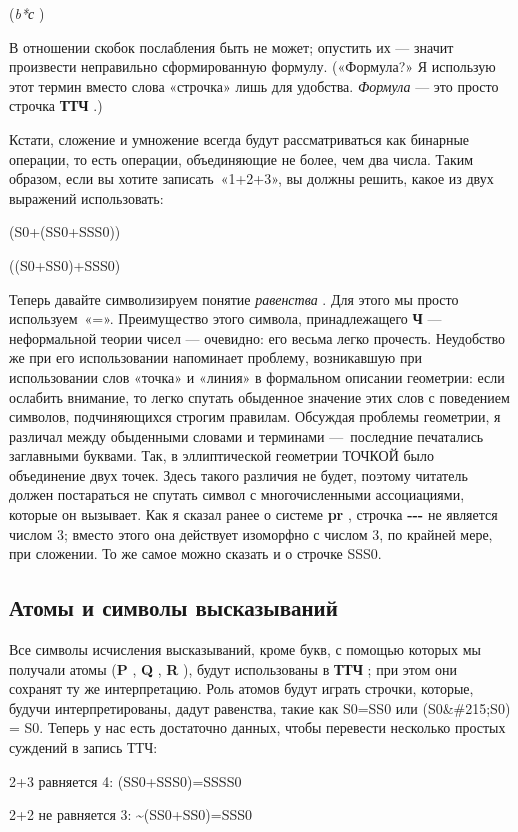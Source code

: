 \documentclass[../main.tex]{subfiles}
\begin{document}
(\emph{b*с} )

В отношении скобок послабления быть не может; опустить их --- значит произвести неправильно сформированную формулу. («Формула?» Я использую этот термин вместо слова «строчка» лишь для удобства. \emph{Формула} --- это просто строчка \textbf{ТТЧ} .)

Кстати, сложение и умножение всегда будут рассматриваться как бинарные операции, то есть операции, объединяющие не более, чем два числа. Таким образом, если вы хотите записать~«1+2+3», вы должны решить, какое из двух выражений использовать:

(S0+(SS0+SSS0))

((S0+SS0)+SSS0)

Теперь давайте символизируем понятие \emph{равенства} . Для этого мы просто используем~«=». Преимущество этого символа, принадлежащего \textbf{Ч} --- неформальной теории чисел --- очевидно: его весьма легко прочесть. Неудобство же при его использовании напоминает проблему, возникавшую при использовании слов «точка» и «линия» в формальном описании геометрии: если ослабить внимание, то легко спутать обыденное значение этих слов с поведением символов, подчиняющихся строгим правилам. Обсуждая проблемы геометрии, я различал между обыденными словами и терминами ---~последние печатались заглавными буквами. Так, в эллиптической геометрии ТОЧКОЙ было объединение двух точек. Здесь такого различия не будет, поэтому читатель должен постараться не спутать символ с многочисленными ассоциациями, которые он вызывает. Как я сказал ранее о системе \textbf{pr} , строчка \textbf{-\/-\/-} не является числом 3; вместо этого она действует изоморфно с числом 3, по крайней мере, при сложении. То же самое можно сказать и о строчке SSS0.


\subsection{Атомы и символы высказываний}

Все символы исчисления высказываний, кроме букв, с помощью которых мы получали атомы (\textbf{P} , \textbf{Q} , \textbf{R} ), будут использованы в \textbf{ТТЧ} ; при этом они сохранят ту же интерпретацию. Роль атомов будут играть строчки, которые, будучи интерпретированы, дадут равенства, такие как S0=SS0 или (S0\&\#215;S0) = S0. Теперь у нас есть достаточно данных, чтобы перевести несколько простых суждений в запись ТТЧ:

2+3 равняется 4: (SS0+SSS0)=SSSS0

2+2 не равняется 3: \textasciitilde(SS0+SS0)=SSS0
\end{document}
